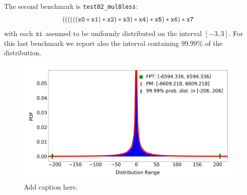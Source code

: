 \documentclass[10pt,conference]{IEEEtran}
\begin{document}
The second benchmark is \texttt{test02\_mul8less}:
\[
\tt{((((((x0 * x1) * x2) * x3) * x4) * x5) * x6) * x7}
\]
with each $\tt xi$ assumed to be uniformly distributed on the interval $\left[-3,3\right]$. For this last benchmark we report also the interval containing 99.99\% of the distribution.
\begin{figure}[h!]
	\includegraphics[scale=0.177]{pics/mul}
	\caption{Add caption here.}
	\label{fig:impl:benchmark2}
\end{figure}





\end{document}
